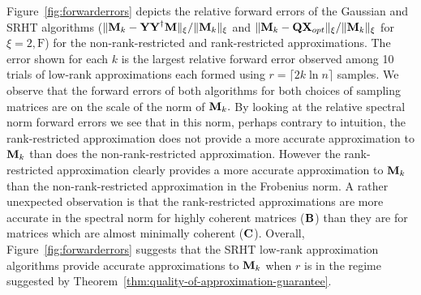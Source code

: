 Figure~\ref{fig:forwarderrors} depicts the relative forward errors of the Gaussian and SRHT algorithms ($\mbox{}\|{\bm{\mathrm{M}}}_k - {\bm{\mathrm{Y}}}{{\bm{\mathrm{Y}}}}^\dagger {\ensuremath{\bm{\mathrm{M}}}}\|_{\xi}/\mbox{}\|{\bm{\mathrm{M}}}_k\|_{\xi}$ and $\mbox{}\|{\bm{\mathrm{M}}}_k - {\bm{\mathrm{Q}}} {\bm{\mathrm{X}}}_{opt}\|_{\xi}/\mbox{}\|{\bm{\mathrm{M}}}_k\|_{\xi}$ for $\xi = 2, \mathrm{F}$) for the non-rank-restricted and rank-restricted approximations. The error shown for each $k$ is the largest relative forward error observed among 10 trials of low-rank approximations each formed using $r = \lceil 2 k \ln n\rceil$ samples. We observe that the forward errors of both algorithms for both choices of sampling matrices are on the scale of the norm of ${\bm{\mathrm{M}}}_k.$ By looking at the relative spectral norm forward errors we see that in this norm, perhaps contrary to intuition, the rank-restricted approximation does not provide a more accurate approximation to ${\bm{\mathrm{M}}}_k$ than does the non-rank-restricted approximation. However the rank-restricted approximation clearly provides a more accurate approximation to ${\bm{\mathrm{M}}}_k$ than the non-rank-restricted
approximation in the
Frobenius norm. A rather
unexpected observation is that the rank-restricted approximations are more accurate in the spectral norm for highly coherent matrices (${\bm{\mathrm{B}}}$) than they are for matrices which are almost minimally coherent (${\bm{\mathrm{C}}}$). Overall, Figure~\ref{fig:forwarderrors} suggests that the SRHT low-rank approximation algorithms provide accurate approximations to ${\bm{\mathrm{M}}}_k$ when $r$ is in the regime suggested by Theorem~\ref{thm:quality-of-approximation-guarantee}.


